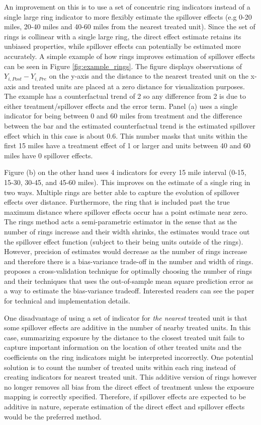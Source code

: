 \documentclass[11pt]{article}
\begin{document}
An improvement on this is to use a set of concentric ring indicators instead of a single large ring indicator to more flexibly estimate the spillover effects (e.g 0-20 miles, 20-40 miles and 40-60 miles from the nearest treated unit). Since the set of rings is collinear with a single large ring, the direct effect estimate retains its unbiased properties, while spillover effects can potentially be estimated more accurately. A simple example of how rings improves estimation of spillover effects can be seen in Figure \ref{fig:example_rings}. The figure displays observations of $Y_{i,Post} - Y_{i,Pre}$ on the y-axis and the distance to the nearest treated unit on the x-axis and treated units are placed at a zero distance for visualization purposes. The example has a counterfactual trend of 2 so any difference from 2 is due to either treatment/spillover effects and the error term. Panel (a) uses a single indicator for being between 0 and 60 miles from treatment and the difference between the bar and the estimated counterfactual trend is the estimated spillover effect which in this case is about 0.6. This number masks that units within the first 15 miles have a treatment effect of 1 or larger and units between 40 and 60 miles have 0 spillover effects. 

Figure (b) on the other hand uses 4 indicators for every 15 mile interval (0-15, 15-30, 30-45, and 45-60 miles). This improves on the estimate of a single ring in two ways. Multiple rings are better able to capture the evolution of spillover effects over distance. Furthermore, the ring that is included past the true maximum distance where spillover effects occur has a point estimate near zero. The rings method acts a semi-parametric estimator in the sense that as the number of rings increase and their width shrinks, the estimates would trace out the spillover effect function (subject to their being units outside of the rings). However, precision of estimates would decrease as the number of rings increase and therefore there is a bias-variance trade-off in the number and width of rings. \citet{Clarke_2017} proposes a cross-validation technique for optimally choosing the number of rings and their techniques that uses the out-of-sample mean square prediction error as a way to estimate the bias-variance tradeoff. Interested readers can see the paper for technical and implementation details.

One disadvantage of using a set of indicator for \textit{the nearest} treated unit is that some spillover effects are additive in the number of nearby treated units. In this case, summarizing exposure by the distance to the closest treated unit fails to capture important information on the location of other treated units and the coefficients on the ring indicators might be interpreted incorrectly. One potential solution is to count the number of treated units within each ring instead of creating indicators for nearest treated unit. This additive version of rings however no longer removes all bias from the direct effect of treatment unless the exposure mapping is correctly specified. Therefore, if spillover effects are expected to be additive in nature, seperate estimation of the direct effect and spillover effects would be the preferred method. 
\end{document}
